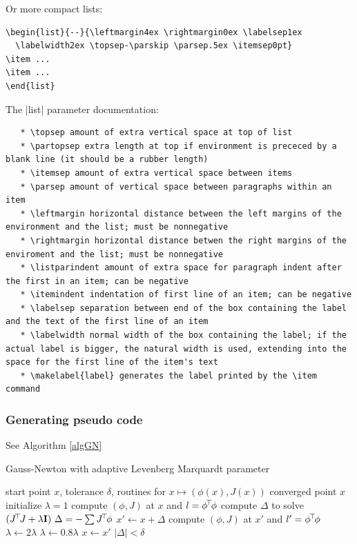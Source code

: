 Or more compact lists:\\
\begin{code}
\begin{verbatim}
\begin{list}{--}{\leftmargin4ex \rightmargin0ex \labelsep1ex
  \labelwidth2ex \topsep-\parskip \parsep.5ex \itemsep0pt}
\item ...
\item ...
\end{list}
\end{verbatim}
\end{code}

The |list| parameter documentation:\\
\begin{code}
\begin{verbatim}
   * \topsep amount of extra vertical space at top of list
   * \partopsep extra length at top if environment is prececed by a blank line (it should be a rubber length)
   * \itemsep amount of extra vertical space between items
   * \parsep amount of vertical space between paragraphs within an item
   * \leftmargin horizontal distance between the left margins of the environment and the list; must be nonnegative
   * \rightmargin horizontal distance betwen the right margins of the enviroment and the list; must be nonnegative
   * \listparindent amount of extra space for paragraph indent after the first in an item; can be negative
   * \itemindent indentation of first line of an item; can be negative
   * \labelsep separation between end of the box containing the label and the text of the first line of an item
   * \labelwidth normal width of the box containing the label; if the actual label is bigger, the natural width is used, extending into the space for the first line of the item's text
   * \makelabel{label} generates the label printed by the \item command
\end{verbatim}
\end{code}

\subsubsection{Generating pseudo code}

See Algorithm \ref{algGN}

\begin{algorithm}[ht]
\caption{Gauss-Newton with adaptive Levenberg Marquardt parameter}
\label{algGN}
\begin{algorithmic}[1]\small
\REQUIRE start point $x$, tolerance $\delta$, routines for $x \mapsto
  (\phi(x), J(x))$
\ENSURE converged point $x$
\STATE initialize $\lambda=1$
\STATE compute $(\phi, J)$ at $x$ and $l=\phi^{\!\top\!} \phi$
\REPEAT
\STATE\label{redo} compute $\Delta$ to solve $(J^{\!\top\!} J +\lambda {\rm\bf I})~ \Delta = - \sum
J^{\!\top\!} \phi$
\STATE $x' \gets x + \Delta$
\STATE compute $(\phi, J)$ at $x'$ and $l'=\phi^{\!\top\!} \phi$
\STATE $\lambda \gets 2\lambda$
\ELSE
\STATE $\lambda \gets 0.8\lambda$
\STATE $x \gets x'$
\ENDIF
\UNTIL $|\Delta| < \delta$
\end{algorithmic}
\end{algorithm}


